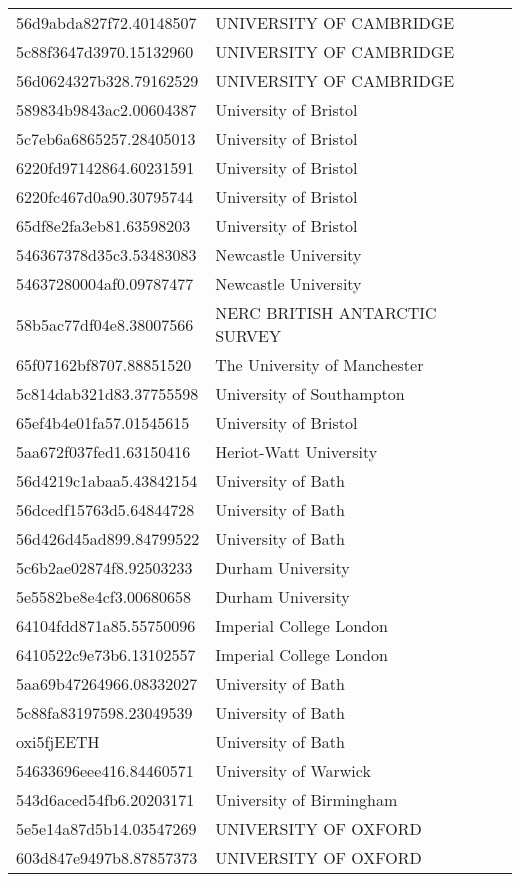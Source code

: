 \begin{tabular}{ll}
56d9abda827f72.40148507 & UNIVERSITY OF CAMBRIDGE \\
5c88f3647d3970.15132960 & UNIVERSITY OF CAMBRIDGE \\
56d0624327b328.79162529 & UNIVERSITY OF CAMBRIDGE \\
589834b9843ac2.00604387 & University of Bristol \\
5c7eb6a6865257.28405013 & University of Bristol \\
6220fd97142864.60231591 & University of Bristol \\
6220fc467d0a90.30795744 & University of Bristol \\
65df8e2fa3eb81.63598203 & University of Bristol \\
546367378d35c3.53483083 & Newcastle University \\
54637280004af0.09787477 & Newcastle University \\
58b5ac77df04e8.38007566 & NERC BRITISH ANTARCTIC SURVEY \\
65f07162bf8707.88851520 & The University of Manchester \\
5c814dab321d83.37755598 & University of Southampton \\
65ef4b4e01fa57.01545615 & University of Bristol \\
5aa672f037fed1.63150416 & Heriot-Watt University \\
56d4219c1abaa5.43842154 & University of Bath \\
56dcedf15763d5.64844728 & University of Bath \\
56d426d45ad899.84799522 & University of Bath \\
5c6b2ae02874f8.92503233 & Durham University \\
5e5582be8e4cf3.00680658 & Durham University \\
64104fdd871a85.55750096 & Imperial College London \\
6410522c9e73b6.13102557 & Imperial College London \\
5aa69b47264966.08332027 & University of Bath \\
5c88fa83197598.23049539 & University of Bath \\
oxi5fjEETH & University of Bath \\
54633696eee416.84460571 & University of Warwick \\
543d6aced54fb6.20203171 & University of Birmingham \\
5e5e14a87d5b14.03547269 & UNIVERSITY OF OXFORD \\
603d847e9497b8.87857373 & UNIVERSITY OF OXFORD \\

\end{tabular}
